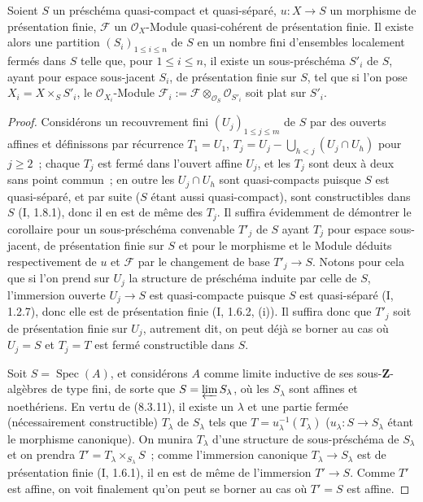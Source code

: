 \begin{corollary}[8.9.5]
\label{IV.8.9.5-fr}
Soient $S$ un préschéma quasi-compact et quasi-séparé, $u:X\to S$ un
morphisme de présentation finie, $\mathcal F$ un $\mathcal O_X$-Module
quasi-cohérent de présentation finie. Il existe alors une partition
$(S_i)_{1\leq i\leq n}$ de $S$ en un nombre fini d'ensembles localement fermés
dans $S$ telle que, pour $1\leq i\leq n$, il existe un sous-préschéma $S'_i$
de $S$, ayant pour espace sous-jacent $S_i$, de présentation finie sur $S$,
tel que si l'on pose $X_i=X\times_SS'_i$, le $\mathcal O_{X_i}$-Module
$\mathcal F_i:=\mathcal F\otimes_{\mathcal O_S}\mathcal O_{S'_i}$ soit plat
sur $S'_i$.
\end{corollary}

\begin{proof}
Considérons un recouvrement fini $(U_j)_{1\leq j\leq m}$ de $S$ par des
ouverts affines et définissons par récurrence $T_1=U_1$,
$T_j=U_j-\bigcup_{h<j}(U_j\cap U_h)$ pour $j\geq2$~; chaque $T_j$ est fermé
dans l'ouvert affine $U_j$, et les $T_j$ sont deux à deux sans point commun~;
en outre les $U_j\cap U_h$ sont quasi-compacts puisque $S$ est quasi-séparé,
et par suite ($S$ étant aussi quasi-compact), sont constructibles dans $S$
(I, 1.8.1), donc il en est de même des $T_j$. Il suffira évidemment de
démontrer le corollaire pour un sous-préschéma convenable $T'_j$ de $S$ ayant
$T_j$ pour espace sous-jacent, de présentation finie sur $S$ et pour le
morphisme et le Module déduits respectivement de $u$ et $\mathcal F$ par le
changement de base $T'_j\to S$. Notons pour cela que si l'on prend sur $U_j$
la structure de préschéma induite par celle de $S$, l'immersion ouverte
$U_j\to S$ est quasi-compacte puisque $S$ est quasi-séparé (I, 1.2.7), donc
elle est de
présentation finie (I, 1.6.2, (i)). Il suffira donc que $T'_j$ soit de
présentation finie sur $U_j$, autrement dit, on peut déjà se borner au cas où
$U_j=S$ et $T_j=T$ est fermé constructible dans $S$.

Soit $S=\operatorname{Spec}(A)$, et considérons $A$ comme limite inductive de
ses sous-$\mathbf Z$-algèbres de type fini, de sorte que
$S=\varprojlim S_\lambda$, où les $S_\lambda$ sont affines et noethériens. En
vertu de (8.3.11), il existe un $\lambda$ et une partie fermée (nécessairement
constructible) $T_\lambda$ de $S_\lambda$ tels que
$T=u_\lambda^{-1}(T_\lambda)$ ($u_\lambda:S\to S_\lambda$ étant le morphisme
canonique). On munira $T_\lambda$ d'une structure de sous-préschéma de
$S_\lambda$ et on prendra $T'=T_\lambda\times_{S_\lambda}S$~; comme
l'immersion canonique $T_\lambda\to S_\lambda$ est de présentation finie
(I, 1.6.1), il en est de même de l'immersion $T'\to S$. Comme $T'$ est affine,
on voit finalement qu'on peut se borner au cas où $T'=S$ est affine.


\end{proof}
